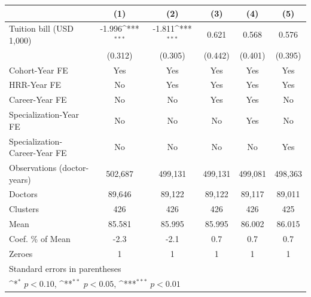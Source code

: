 {
\def\sym#1{\ifmmode^{#1}\else\(^{#1}\)\fi}
\begin{tabular}{l*{5}{c}}
\hline\hline
                    &\multicolumn{1}{c}{(1)}         &\multicolumn{1}{c}{(2)}         &\multicolumn{1}{c}{(3)}         &\multicolumn{1}{c}{(4)}         &\multicolumn{1}{c}{(5)}         \\
\hline
Tuition bill (USD 1,000)&      -1.996\sym{***}&      -1.811\sym{***}&       0.621         &       0.568         &       0.576         \\
                    &     (0.312)         &     (0.305)         &     (0.442)         &     (0.401)         &     (0.395)         \\
[1em]
Cohort-Year FE      &         Yes         &         Yes         &         Yes         &         Yes         &         Yes         \\
[1em]
HRR-Year FE         &          No         &         Yes         &         Yes         &         Yes         &         Yes         \\
[1em]
Career-Year FE      &          No         &          No         &         Yes         &         Yes         &          No         \\
[1em]
Specialization-Year FE&          No         &          No         &          No         &         Yes         &          No         \\
[1em]
Specialization-Career-Year FE&          No         &          No         &          No         &          No         &         Yes         \\
\hline
Observations (doctor-years)&     502,687         &     499,131         &     499,131         &     499,081         &     498,363         \\
Doctors             &      89,646         &      89,122         &      89,122         &      89,117         &      89,011         \\
Clusters            &         426         &         426         &         426         &         426         &         425         \\
Mean                &      85.581         &      85.995         &      85.995         &      86.002         &      86.015         \\
Coef. \% of Mean    &        -2.3         &        -2.1         &         0.7         &         0.7         &         0.7         \\
Zeroes              &           1         &           1         &           1         &           1         &           1         \\
\hline\hline
\multicolumn{6}{l}{\footnotesize Standard errors in parentheses}\\
\multicolumn{6}{l}{\footnotesize \sym{*} \(p<0.10\), \sym{**} \(p<0.05\), \sym{***} \(p<0.01\)}\\
\end{tabular}
}

